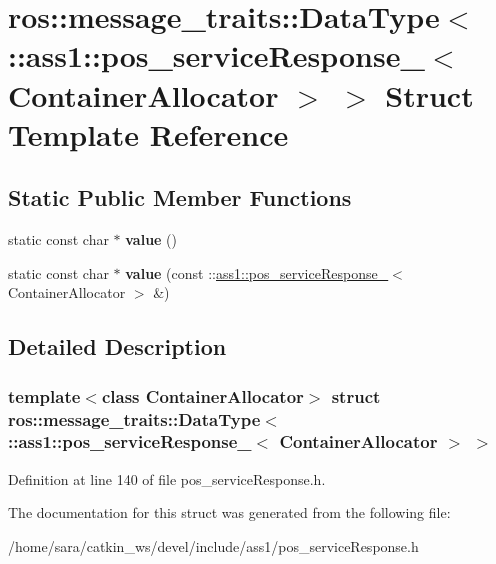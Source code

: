 \hypertarget{structros_1_1message__traits_1_1DataType_3_01_1_1ass1_1_1pos__serviceResponse___3_01ContainerAllocator_01_4_01_4}{}\section{ros\+:\+:message\+\_\+traits\+:\+:Data\+Type$<$ \+:\+:ass1\+:\+:pos\+\_\+service\+Response\+\_\+$<$ Container\+Allocator $>$ $>$ Struct Template Reference}
\label{structros_1_1message__traits_1_1DataType_3_01_1_1ass1_1_1pos__serviceResponse___3_01ContainerAllocator_01_4_01_4}
\subsection*{Static Public Member Functions}
\begin{DoxyCompactItemize}
\item 
\mbox{\label{structros_1_1message__traits_1_1DataType_3_01_1_1ass1_1_1pos__serviceResponse___3_01ContainerAllocator_01_4_01_4_a7bfaf3ea19459ed3ab496286dc7228e0}} 
static const char $\ast$ {\bfseries value} ()
\item 
\mbox{\label{structros_1_1message__traits_1_1DataType_3_01_1_1ass1_1_1pos__serviceResponse___3_01ContainerAllocator_01_4_01_4_aae19cdd73d88437f4f8716d70aa53d7a}} 
static const char $\ast$ {\bfseries value} (const \+::\hyperlink{structass1_1_1pos__serviceResponse__}{ass1\+::pos\+\_\+service\+Response\+\_\+}$<$ Container\+Allocator $>$ \&)
\end{DoxyCompactItemize}


\subsection{Detailed Description}
\subsubsection*{template$<$class Container\+Allocator$>$\newline
struct ros\+::message\+\_\+traits\+::\+Data\+Type$<$ \+::ass1\+::pos\+\_\+service\+Response\+\_\+$<$ Container\+Allocator $>$ $>$}



Definition at line 140 of file pos\+\_\+service\+Response.\+h.



The documentation for this struct was generated from the following file\+:\begin{DoxyCompactItemize}
\item 
/home/sara/catkin\+\_\+ws/devel/include/ass1/pos\+\_\+service\+Response.\+h\end{DoxyCompactItemize}
